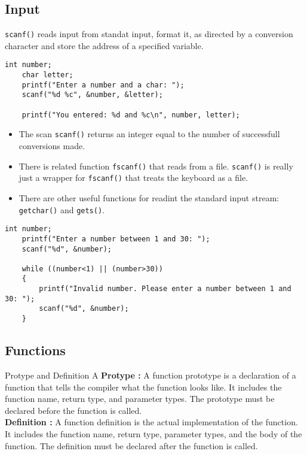 \documentclass[a4paper, 10pt]{article}
\begin{document}
\subsection{Input}
\texttt{scanf()} reads input from standat input, format it, as directed by a conversion character and store the address of a specified variable.
\begin{lstlisting}[style=cStyle, caption={Reading an integer}]
    int number; 
    char letter; 
    printf("Enter a number and a char: ");
    scanf("%d %c", &number, &letter);

    printf("You entered: %d and %c\n", number, letter);
\end{lstlisting}
\begin{itemize}
    \item The scan \texttt{scanf()} returns an integer equal to the number of successfull conversions made.
    \item There is related function \texttt{fscanf()} that reads from a file. \texttt{scanf()} is really just a wrapper for \texttt{fscanf()} that treats the keyboard as a file.
    \item There are other useful functions for readint the standard input stream: \texttt{getchar()} and \texttt{gets()}.
\end{itemize}
\begin{lstlisting}[style=cStyle, caption={Check for no input}]
    int number;
    printf("Enter a number between 1 and 30: ");
    scanf("%d", &number);

    while ((number<1) || (number>30))
    {
        printf("Invalid number. Please enter a number between 1 and 30: ");
        scanf("%d", &number);
    }
\end{lstlisting}

\subsection{Functions}
\begin{definitionbox}{Protype and Definition}{}
    A \textbf{Protype :} A function prototype is a declaration of a function that tells the compiler what the function looks like. It includes the function name, return type, and parameter types. The prototype must be declared before the function is called. \\
    \textbf{Definition :} A function definition is the actual implementation of the function. It includes the function name, return type, parameter types, and the body of the function. The definition must be declared after the function is called.
\end{definitionbox}
\end{document}
